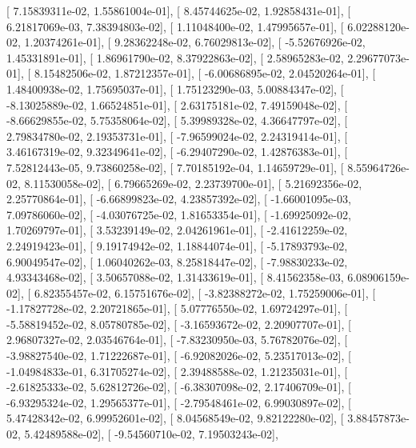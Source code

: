 \documentclass{article}
\begin{document}
       [  7.15839311e-02,   1.55861004e-01],
       [  8.45744625e-02,   1.92858431e-01],
       [  6.21817069e-03,   7.38394803e-02],
       [  1.11048400e-02,   1.47995657e-01],
       [  6.02288120e-02,   1.20374261e-01],
       [  9.28362248e-02,   6.76029813e-02],
       [ -5.52676926e-02,   1.45331891e-01],
       [  1.86961790e-02,   8.37922863e-02],
       [  2.58965283e-02,   2.29677073e-01],
       [  8.15482506e-02,   1.87212357e-01],
       [ -6.00686895e-02,   2.04520264e-01],
       [  1.48400938e-02,   1.75695037e-01],
       [  1.75123290e-03,   5.00884347e-02],
       [ -8.13025889e-02,   1.66524851e-01],
       [  2.63175181e-02,   7.49159048e-02],
       [ -8.66629855e-02,   5.75358064e-02],
       [  5.39989328e-02,   4.36647797e-02],
       [  2.79834780e-02,   2.19353731e-01],
       [ -7.96599024e-02,   2.24319414e-01],
       [  3.46167319e-02,   9.32349641e-02],
       [ -6.29407290e-02,   1.42876383e-01],
       [  7.52812443e-05,   9.73860258e-02],
       [  7.70185192e-04,   1.14659729e-01],
       [  8.55964726e-02,   8.11530058e-02],
       [  6.79665269e-02,   2.23739700e-01],
       [  5.21692356e-02,   2.25770864e-01],
       [ -6.66899823e-02,   4.23857392e-02],
       [ -1.66001095e-03,   7.09786060e-02],
       [ -4.03076725e-02,   1.81653354e-01],
       [ -1.69925092e-02,   1.70269797e-01],
       [  3.53239149e-02,   2.04261961e-01],
       [ -2.41612259e-02,   2.24919423e-01],
       [  9.19174942e-02,   1.18844074e-01],
       [ -5.17893793e-02,   6.90049547e-02],
       [  1.06040262e-03,   8.25818447e-02],
       [ -7.98830233e-02,   4.93343468e-02],
       [  3.50657088e-02,   1.31433619e-01],
       [  8.41562358e-03,   6.08906159e-02],
       [  6.82355457e-02,   6.15751676e-02],
       [ -3.82388272e-02,   1.75259006e-01],
       [ -1.17827728e-02,   2.20721865e-01],
       [  5.07776550e-02,   1.69724297e-01],
       [ -5.58819452e-02,   8.05780785e-02],
       [ -3.16593672e-02,   2.20907707e-01],
       [  2.96807327e-02,   2.03546764e-01],
       [ -7.83230950e-03,   5.76782076e-02],
       [ -3.98827540e-02,   1.71222687e-01],
       [ -6.92082026e-02,   5.23517013e-02],
       [ -1.04984833e-01,   6.31705274e-02],
       [  2.39488588e-02,   1.21235031e-01],
       [ -2.61825333e-02,   5.62812726e-02],
       [ -6.38307098e-02,   2.17406709e-01],
       [ -6.93295324e-02,   1.29565377e-01],
       [ -2.79548461e-02,   6.99030897e-02],
       [  5.47428342e-02,   6.99952601e-02],
       [  8.04568549e-02,   9.82122280e-02],
       [  3.88457873e-02,   5.42489588e-02],
       [ -9.54560710e-02,   7.19503243e-02],
\end{document}
